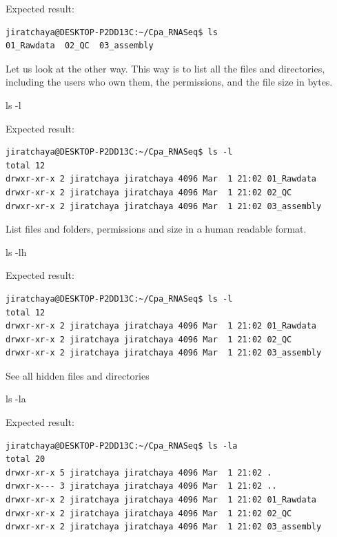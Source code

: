 \documentclass[
  letterpaper,
  DIV=11,
  numbers=noendperiod]{scrreprt}
\newenvironment{Shaded}{\begin{snugshade}}{\end{snugshade}}
\newcommand{\AttributeTok}[1]{\textcolor[rgb]{0.40,0.45,0.13}{#1}}
\newcommand{\FunctionTok}[1]{\textcolor[rgb]{0.28,0.35,0.67}{#1}}
\begin{document}
Expected result:

\begin{verbatim}
jiratchaya@DESKTOP-P2DD13C:~/Cpa_RNASeq$ ls
01_Rawdata  02_QC  03_assembly
\end{verbatim}

Let us look at the other way. This way is to list all the files and
directories, including the users who own them, the permissions, and the
file size in bytes.

\begin{Shaded}
\begin{Highlighting}[]
\FunctionTok{ls} \AttributeTok{{-}l}
\end{Highlighting}
\end{Shaded}

Expected result:

\begin{verbatim}
jiratchaya@DESKTOP-P2DD13C:~/Cpa_RNASeq$ ls -l
total 12
drwxr-xr-x 2 jiratchaya jiratchaya 4096 Mar  1 21:02 01_Rawdata
drwxr-xr-x 2 jiratchaya jiratchaya 4096 Mar  1 21:02 02_QC
drwxr-xr-x 2 jiratchaya jiratchaya 4096 Mar  1 21:02 03_assembly
\end{verbatim}

List files and folders, permissions and size in a human readable format.

\begin{Shaded}
\begin{Highlighting}[]
\FunctionTok{ls} \AttributeTok{{-}lh}
\end{Highlighting}
\end{Shaded}

Expected result:

\begin{verbatim}
jiratchaya@DESKTOP-P2DD13C:~/Cpa_RNASeq$ ls -l
total 12
drwxr-xr-x 2 jiratchaya jiratchaya 4096 Mar  1 21:02 01_Rawdata
drwxr-xr-x 2 jiratchaya jiratchaya 4096 Mar  1 21:02 02_QC
drwxr-xr-x 2 jiratchaya jiratchaya 4096 Mar  1 21:02 03_assembly
\end{verbatim}

See all hidden files and directories

\begin{Shaded}
\begin{Highlighting}[]
\FunctionTok{ls} \AttributeTok{{-}la}
\end{Highlighting}
\end{Shaded}

Expected result:

\begin{verbatim}
jiratchaya@DESKTOP-P2DD13C:~/Cpa_RNASeq$ ls -la
total 20
drwxr-xr-x 5 jiratchaya jiratchaya 4096 Mar  1 21:02 .
drwxr-x--- 3 jiratchaya jiratchaya 4096 Mar  1 21:02 ..
drwxr-xr-x 2 jiratchaya jiratchaya 4096 Mar  1 21:02 01_Rawdata
drwxr-xr-x 2 jiratchaya jiratchaya 4096 Mar  1 21:02 02_QC
drwxr-xr-x 2 jiratchaya jiratchaya 4096 Mar  1 21:02 03_assembly
\end{verbatim}
\end{document}
